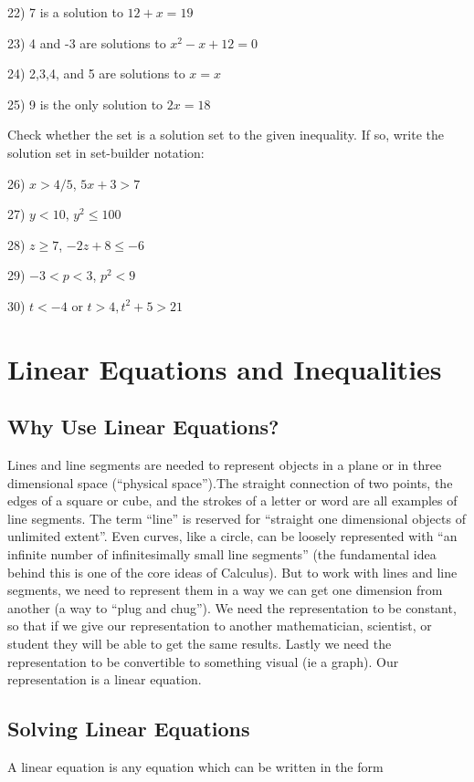 \documentclass{book}
\theoremstyle{definition}
\begin{document}
22) 7 is a solution to $12+x=19$

23) 4 and -3 are solutions to $x^2-x+12=0$

24) 2,3,4, and 5 are solutions to $x=x$

25) 9 is the only solution to $2x=18$


\vspace{5mm}

Check whether the set is a solution set to the given inequality. If so, write the solution set in set-builder notation:

\vspace{3mm}

26) $x>4/5$, $5x+3>7$

27) $y<10$, $y^2\leq100$

28) $z\geq7$, $-2z+8\leq-6$

29) $-3<p<3$, $p^2<9$

30) $t<-4$ or $t>4,t^2+5>21$

\newpage

\section{Linear Equations and Inequalities}
\subsection{Why Use Linear Equations?}
Lines and line segments are needed to represent objects in a plane or in three dimensional space (``physical space'').The straight connection of two points, the edges of a square or cube, and the strokes of a letter or word are all examples of line segments. The term ``line'' is reserved for ``straight one dimensional objects of unlimited extent''. Even curves, like a circle, can be loosely represented with ``an infinite number of infinitesimally small line segments'' (the fundamental idea behind this is one of the core ideas of Calculus).  
But to work with lines and line segments, we need to represent them in a way we can get one dimension from another (a way to “plug and chug”). We need the representation to be constant, so that if we give our representation to another mathematician, scientist, or student they will be able to get the same results. Lastly we need the representation to be convertible to something visual (ie a graph). Our representation is a linear equation.
\subsection{Solving Linear Equations}
A linear equation is any equation which can be written in the form
\end{document}
